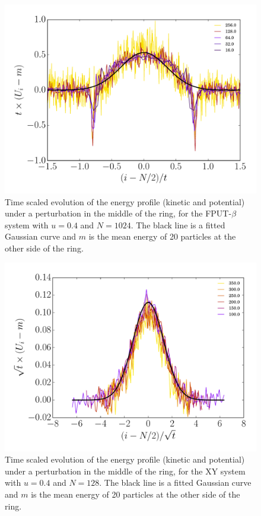 \documentclass[aps,pre,showpacs,twocolumn,superscriptaddress,floatfix]{revtex4-1}
\begin{document}
{\begin{figure}
 \centering
 \includegraphics[width=1.0\linewidth]{./Time_NrgProf_FPU__U0_0.4__N_1024.pdf}
 \caption{Time scaled evolution of the energy profile (kinetic and potential) 
 under a perturbation in the middle of the ring, for the FPUT-$\beta$ system
 with $u=0.4$ and $N=1024$. The black line is a fitted Gaussian curve and $m$ 
 is the mean energy of 20 particles at the other side of the ring.}
 \label{fig:Time_NrgProf_HC}
\end{figure}


\begin{figure}
 \centering
 \includegraphics[width=1.0\linewidth]{./Time_NrgProf_XY__U0_0.4__N_128.pdf}
 \caption{Time scaled evolution of the energy profile (kinetic and potential) 
 under a perturbation in the middle of the ring, for the XY system 
 with $u=0.4$ and $N=128$. The black line is a fitted Gaussian curve and $m$ 
 is the mean energy of 20 particles at the other side of the ring.}
 \label{fig:Time_NrgProf_HC}
\end{figure}




}
\end{document}
